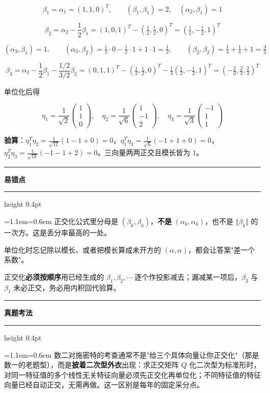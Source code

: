 \documentclass[11pt,openany,UTF8]{ctexbook}
\newcommand{\callouthead}[2]{%
  \par\addvspace{7pt}\noindent
  {\color{#1}\rule[-0.15em]{3pt}{1.05em}}\hspace{0.5em}%
  {\bfseries\color{#1}#2}\par\nobreak\vspace{-0.35em}%
  {\color{rulesep}\hrule height 0.4pt}\nobreak\vspace{0.45em}%
  \begingroup\small\setlength{\parindent}{0pt}%
  \leftskip=1.1em\rightskip=0.6em\noindent\ignorespaces}
\newcommand{\calloutend}{\par\endgroup\addvspace{7pt}}
\newenvironment{callwarn}[1]{\callouthead{warnbar}{#1}}{\calloutend}
\newenvironment{callexam}[1]{\callouthead{exambar}{#1}}{\calloutend}
\begin{document}
\[\beta_1=\alpha_1=(1,1,0)^T,\qquad (\beta_1,\beta_1)=2,\quad (\alpha_2,\beta_1)=1\]

\[\beta_2=\alpha_2-\frac{1}{2}\beta_1=(1,0,1)^T-\left(\tfrac12,\tfrac12,0\right)^T=\left(\tfrac12,-\tfrac12,1\right)^T\]

\[(\alpha_3,\beta_1)=1,\qquad (\alpha_3,\beta_2)=\tfrac12\cdot 0-\tfrac12\cdot 1+1\cdot 1=\tfrac12,\qquad (\beta_2,\beta_2)=\tfrac14+\tfrac14+1=\tfrac32\]

\[\beta_3=\alpha_3-\frac{1}{2}\beta_1-\frac{1/2}{3/2}\beta_2=(0,1,1)^T-\left(\tfrac12,\tfrac12,0\right)^T-\tfrac13\left(\tfrac12,-\tfrac12,1\right)^T=\left(-\tfrac23,\tfrac23,\tfrac23\right)^T\]

单位化后得

\[\eta_1=\frac{1}{\sqrt2}\begin{pmatrix} 1 \\ 1 \\ 0 \end{pmatrix},\quad
\eta_2=\frac{1}{\sqrt6}\begin{pmatrix} 1 \\ -1 \\ 2 \end{pmatrix},\quad
\eta_3=\frac{1}{\sqrt3}\begin{pmatrix} -1 \\ 1 \\ 1 \end{pmatrix}\]

\textbf{验算}：$\eta_1^T\eta_2=\frac{1}{\sqrt{12}}(1-1+0)=0$，$\eta_1^T\eta_3=\frac{1}{\sqrt6}(-1+1+0)=0$，$\eta_2^T\eta_3=\frac{1}{\sqrt{18}}(-1-1+2)=0$。三向量两两正交且模长皆为 $1$。

\begin{callwarn}{易错点}
正交化公式里分母是 $(\beta_k,\beta_k)$，\textbf{不是} $(\alpha_k,\alpha_k)$，也不是 $\Vert\beta_k\Vert$ 的一次方。这是丢分率最高的一处。

单位化时忘记除以模长、或者把模长算成未开方的 $(\alpha,\alpha)$，都会让答案"差一个系数"。

正交化\textbf{必须按顺序}用已经生成的 $\beta_1,\beta_2,\cdots$ 逐个作投影减去；漏减某一项后，$\beta_3$ 与 $\beta_1$ 未必正交，务必用内积回代验算。

\end{callwarn}

\begin{callexam}{真题考法}
数二对施密特的考查通常不是"给三个具体向量让你正交化"（那是数一的老题型），而是\textbf{披着二次型外衣}出现：求正交矩阵 $Q$ 化二次型为标准形时，对同一特征值的多个线性无关特征向量必须先正交化再单位化；不同特征值的特征向量已经自动正交，无需再做。这一区别是每年的固定采分点。

\end{callexam}
\end{document}
